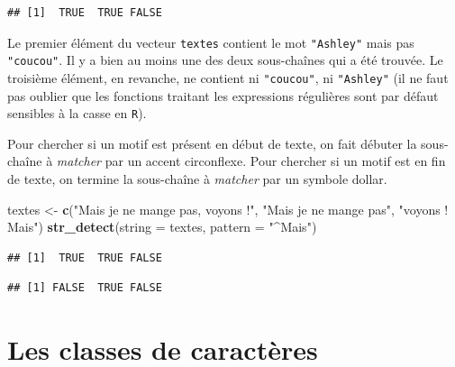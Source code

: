 \documentclass[
  11pt,
]{book}
\newenvironment{Shaded}{\begin{snugshade}}{\end{snugshade}}
\newcommand{\DataTypeTok}[1]{\textcolor[rgb]{0.13,0.29,0.53}{#1}}
\newcommand{\KeywordTok}[1]{\textcolor[rgb]{0.13,0.29,0.53}{\textbf{#1}}}
\newcommand{\NormalTok}[1]{#1}
\newcommand{\StringTok}[1]{\textcolor[rgb]{0.31,0.60,0.02}{#1}}
\numberwithin{equation}{section}
\numberwithin{countremarque}{section}
\begin{document}
\begin{lstlisting}
## [1]  TRUE  TRUE FALSE
\end{lstlisting}

Le premier élément du vecteur \texttt{textes} contient le mot \texttt{"Ashley"} mais pas \texttt{"coucou"}. Il y a bien au moins une des deux sous-chaînes qui a été trouvée. Le troisième élément, en revanche, ne contient ni \texttt{"coucou"}, ni \texttt{"Ashley"} (il ne faut pas oublier que les fonctions traitant les expressions régulières sont par défaut sensibles à la casse en \texttt{R}).

Pour chercher si un motif est présent en début de texte, on fait débuter la sous-chaîne à \emph{matcher} par un accent circonflexe. Pour chercher si un motif est en fin de texte, on termine la sous-chaîne à \emph{matcher} par un symbole dollar.

\begin{Shaded}
\begin{Highlighting}[]
\NormalTok{textes \textless{}{-}}\StringTok{ }\KeywordTok{c}\NormalTok{(}\StringTok{"Mais je ne mange pas, voyons !"}\NormalTok{,}
          \StringTok{"Mais je ne mange pas"}\NormalTok{, }\StringTok{"voyons ! Mais"}\NormalTok{)}
\KeywordTok{str\_detect}\NormalTok{(}\DataTypeTok{string =}\NormalTok{ textes, }\DataTypeTok{pattern =} \StringTok{"\^{}Mais"}\NormalTok{)}
\end{Highlighting}
\end{Shaded}

\begin{lstlisting}
## [1]  TRUE  TRUE FALSE
\end{lstlisting}

\begin{Shaded}
\end{Shaded}

\begin{lstlisting}
## [1] FALSE  TRUE FALSE
\end{lstlisting}

\hypertarget{manip_regex_classes}{%
\section{Les classes de caractères}\label{manip_regex_classes}}
\end{document}
